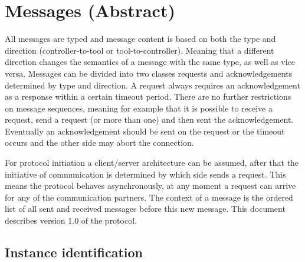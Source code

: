 \documentclass{article}
\begin{document}

  
 \section{Messages (Abstract)} \label{s:message_definitions}

  All messages are typed and message content is based on both the type and
  direction (controller-to-tool or tool-to-controller). Meaning that a
  different direction changes the semantics of a message with the same type, as
  well as vice versa. Messages can be divided into two classes requests and
  acknowledgements determined by type and direction. A request always requires
  an acknowledgement as a response within a certain timeout period. There are
  no further restrictions on message sequences, meaning for example that it is
  possible to receive a request, send a request (or more than one) and then
  sent the acknowledgement. Eventually an acknowledgement should be sent on the
  request or the timeout occurs and the other side may abort the connection.
  
  For protocol initiation a client/server architecture can be assumed, after
  that the initiative of communication is determined by which side sends a
  request. This means the protocol behaves asynchronously, at any moment a
  request can arrive for any of the communication partners. The context of a
  message is the ordered list of all sent and received messages before this new
  message.  This document describes version 1.0 of the protocol.

  \subsection{Instance identification}
\end{document}
